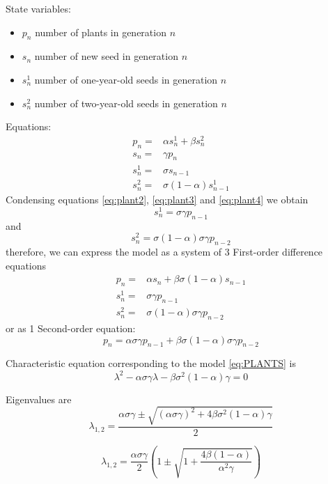 State variables:
\begin{itemize}
\item $p_n$ number of plants in generation $n$
\item $s_n$ number of new seed in generation $n$
\item $s^1_n$ number of one-year-old seeds in generation $n$
\item $s_{n}^{2}$ number of two-year-old seeds in generation $n$
\end{itemize}
Equations:
\begin{subequations}\label{eq:plant}
\begin{align}
p_n=&\alpha s^1_n+\beta s_{n}^{2}\label{eq:plant1}\\
s_{n}=&\gamma p_{n}\label{eq:plant2}\\
s_n^1=&\sigma s_{n-1}\label{eq:plant3}\\
s_{n}^{2}=&\sigma (1-\alpha)s^1_{n-1}\label{eq:plant4}
\end{align}   
\end{subequations} 
Condensing equations \eqref{eq:plant2}, \eqref{eq:plant3} and \eqref{eq:plant4} we obtain
$$s_n^1=\sigma \gamma p_{n-1}$$
and 
$$s_{n}^{2}=\sigma (1-\alpha)\sigma \gamma p_{n-2}$$
therefore, we can express the model as a system of 3 First-order difference equations
\begin{equation*}
\begin{array}{ll}
p_n=&\alpha s_n+\beta \sigma (1-\alpha)s_{n-1}\\
s_n^1=&\sigma \gamma p_{n-1}\\
s_{n}^{2}=&\sigma (1-\alpha)\sigma \gamma p_{n-2}
\end{array}
\end{equation*}
or as 1 Second-order equation:
\begin{equation}\label{eq:PLANTS}
p_n=\alpha \sigma \gamma p_{n-1}+\beta \sigma (1-\alpha)\sigma \gamma p_{n-2}
\end{equation}

Characteristic equation corresponding to the model \eqref{eq:PLANTS} is
$$\lambda ^2 - \alpha \sigma \gamma \lambda - \beta \sigma^2 (1-\alpha) \gamma=0$$

Eigenvalues are
$$\lambda _{1,2}=\frac{\alpha \sigma \gamma \pm \sqrt{(\alpha \sigma \gamma)^2+4\beta \sigma^2 (1-\alpha) \gamma}}{2}$$


$$\lambda _{1,2}=\frac{\alpha \sigma \gamma }{2}\left (1\pm \sqrt{1+\frac{4\beta  (1-\alpha)}{\alpha^2 \gamma }}\right )$$


